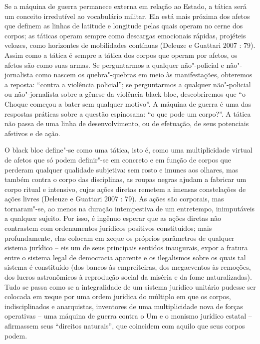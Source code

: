 Se a máquina de guerra permanece externa em relação ao Estado, a tática
será um conceito irredutível ao vocabulário militar. Ela está mais
próxima dos afetos que definem as linhas de latitude e longitude pelas
quais operam no cerne dos corpos; as táticas operam sempre como
descargas emocionais rápidas, projéteis velozes, como horizontes de
mobilidades contínuas (Deleuze e Guattari 2007 : 79). Assim como a
tática é sempre a tática dos corpos que operam por afetos, os afetos são
como suas armas. Se perguntarmos a qualquer não"-policial e
não"-jornalista como nascem os quebra"-quebras em meio às manifestações,
obteremos a reposta: ``contra a violência policial''; se perguntarmos a
qualquer não"-policial ou não"-jornalista sobre a gênese da violência
black bloc, descobriremos que ``o Choque começou a bater sem qualquer
motivo''. A máquina de guerra é uma das respostas práticas sobre a
questão espinosana: ``o que pode um corpo?''. A tática não passa de uma
linha de desenvolvimento, ou de efetuação, de seus potenciais afetivos e
de ação.

O black bloc define"-se como uma tática, isto é, como uma multiplicidade
virtual de afetos que só podem definir"-se em concreto e em função de
corpos que perderam qualquer qualidade subjetiva: sem rosto e imunes aos
olhares, mas também contra o corpo das disciplinas, as roupas negras
ajudam a fabricar um corpo ritual e intensivo, cujas ações diretas
remetem a imensas constelações de ações livres (Deleuze e Guattari 2007
: 79). As ações são corporais, mas tornaram"-se, ao menos na duração
intempestiva de um entretempo, inimputáveis a qualquer sujeito. Por
isso, é ingênuo esperar que as ações diretas não contrastem com
ordenamentos jurídicos positivos constituídos; mais profundamente, elas
colocam em xeque os próprios parâmetros de qualquer sistema jurídico --
eis um de seus principais sentidos inaugurais, expor a fratura entre o
sistema legal de democracia aparente e os ilegalismos sobre os quais tal
sistema é constituído (dos bancos às empreiteiras, dos megaeventos às
remoções, dos lucros astronômicos à reprodução social da miséria e da
fome naturalizadas). Tudo se passa como se a integralidade de um sistema
jurídico unitário pudesse ser colocada em xeque por uma ordem jurídica
do múltiplo em que os corpos, indisciplinados e anarquistas, inventores
de uma multiplicidade nova de forças operativas -- uma máquina de guerra
contra o Um e o monismo jurídico estatal -- afirmassem seus ``direitos
naturais'', que coincidem com aquilo que seus corpos podem.

